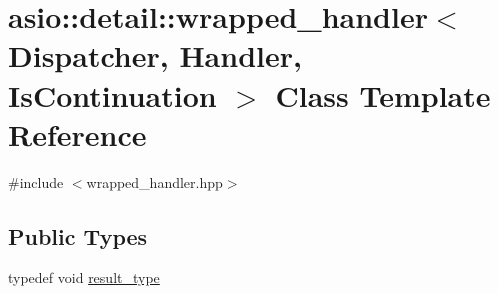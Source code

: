\hypertarget{classasio_1_1detail_1_1wrapped__handler}{}\section{asio\+:\+:detail\+:\+:wrapped\+\_\+handler$<$ Dispatcher, Handler, Is\+Continuation $>$ Class Template Reference}
\label{classasio_1_1detail_1_1wrapped__handler}


{\ttfamily \#include $<$wrapped\+\_\+handler.\+hpp$>$}

\subsection*{Public Types}
\begin{DoxyCompactItemize}
\item 
typedef void \hyperlink{classasio_1_1detail_1_1wrapped__handler_ac7edc27224485b7087df71db0e1c952a}{result\+\_\+type}
\end{DoxyCompactItemize}

